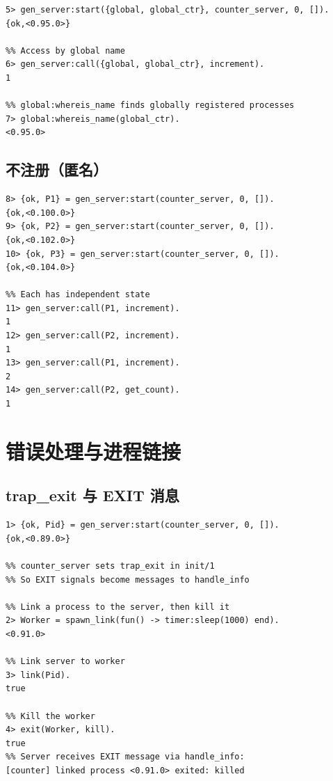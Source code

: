 \documentclass[a4paper,11pt]{article}
\begin{document}
\begin{lstlisting}[style=shellstyle, caption={全局注册演示}]
5> gen_server:start({global, global_ctr}, counter_server, 0, []).
{ok,<0.95.0>}

%% Access by global name
6> gen_server:call({global, global_ctr}, increment).
1

%% global:whereis_name finds globally registered processes
7> global:whereis_name(global_ctr).
<0.95.0>
\end{lstlisting}

\subsection{不注册（匿名）}

\begin{lstlisting}[style=shellstyle, caption={匿名启动 --- 可以启动多个实例}]
8> {ok, P1} = gen_server:start(counter_server, 0, []).
{ok,<0.100.0>}
9> {ok, P2} = gen_server:start(counter_server, 0, []).
{ok,<0.102.0>}
10> {ok, P3} = gen_server:start(counter_server, 0, []).
{ok,<0.104.0>}

%% Each has independent state
11> gen_server:call(P1, increment).
1
12> gen_server:call(P2, increment).
1
13> gen_server:call(P1, increment).
2
14> gen_server:call(P2, get_count).
1
\end{lstlisting}


\section{错误处理与进程链接}

\subsection{trap\_exit 与 EXIT 消息}

\begin{lstlisting}[style=shellstyle, caption={trap\_exit 演示}]
1> {ok, Pid} = gen_server:start(counter_server, 0, []).
{ok,<0.89.0>}

%% counter_server sets trap_exit in init/1
%% So EXIT signals become messages to handle_info

%% Link a process to the server, then kill it
2> Worker = spawn_link(fun() -> timer:sleep(1000) end).
<0.91.0>

%% Link server to worker
3> link(Pid).
true

%% Kill the worker
4> exit(Worker, kill).
true
%% Server receives EXIT message via handle_info:
[counter] linked process <0.91.0> exited: killed
\end{lstlisting}
\end{document}
